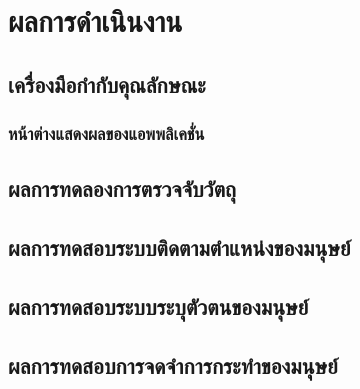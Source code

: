 \chapter{ผลการดำเนินงาน}
\section{เครื่องมือกำกับคุณลักษณะ}
\subsection{หน้าต่างแสดงผลของแอพพลิเคชั่น}


\clearpage
\section{ผลการทดลองการตรวจจับวัตถุ}

\clearpage
\section{ผลการทดสอบระบบติดตามตำแหน่งของมนุษย์}

\clearpage
\section{ผลการทดสอบระบบระบุตัวตนของมนุษย์}

\clearpage
\section{ผลการทดสอบการจดจำการกระทำของมนุษย์}
